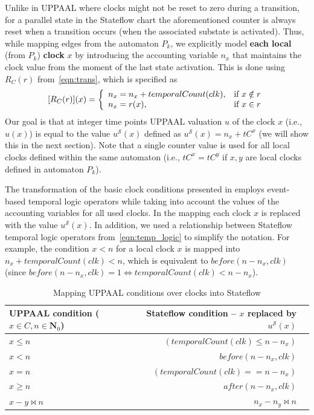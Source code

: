 Unlike in UPPAAL where clocks might not be reset to zero during a transition, for a parallel state in the Stateflow chart the aforementioned counter is always reset when a transition occurs (when the associated substate is activated). Thus, while mapping edges from the automaton $P_k$, we explicitly model \textbf{each local} (from $P_k$) \textbf{clock} $x$ by introducing the accounting variable $n_x$ that maintains the clock value from the moment of the last state activation. This is done using $R_{C}(r)$ from~\eqref{eqn:trans}, which is specified as
\begin{equation}
\label{eqn:lclock_res}
[R_{C}(r)](x) = \left\{
\begin{array}{lr} 
n_x=n_x+temporalCount(clk), & \hbox{if } x\notin r\\
n_x = r(x),& \hbox{if } x\in r
\end{array}
\right.
\end{equation}
Our goal is that at integer time points UPPAAL valuation $u$ of the clock $x$ (i.e.,~$u(x)$) is equal to the value 
$u^\mathcal{S}(x)$ defined as 
$
\label{eqn:us_def}
u^\mathcal{S}(x)=n_x+tC^x
$ 
(we will show this in the next section). Note that a single counter value is used for all local clocks defined within the same automaton (i.e., $tC^x=tC^y$ if $x,y$ are local clocks defined in automaton $P_k$). 


The transformation of the basic clock conditions presented in  employs event-based temporal logic operators while taking into account the values of the accounting variables for all used clocks. In the mapping each clock $x$ is replaced with the value $u^\mathcal{S}(x)$. In addition, we used a relationship between Stateflow temporal logic operators from~\eqref{eqn:temp_logic} to simplify the notation. For example, the condition $x<n$ for a local clock $x$ is mapped into $n_x+temporalCount(clk)<n$, which is equivalent to $before(n-n_x,clk)$ (since $before(n-n_x,clk)=1\Leftrightarrow temporalCount(clk)< n-n_x$).


\begin{table}[!t]
{
\centering
\begin{tabular}{|l|r|r|}
\hline
UPPAAL condition ($x\in C,n\in \mathbf{N}_0$) & Stateflow condition --  $x$ replaced by $u^\mathcal{S}(x)$ \\
\hline
$x\leq n$ &  $(temporalCount(clk)\leq n-n_x)$ \\
$x< n$  & $before(n-n_x,clk)$ \\
$x= n$   & $(temporalCount(clk)==n-n_x)$ \\
$x\geq n$  & $after(n-n_x,clk)$ \\
$x-y\bowtie n$  & $n_x-n_y\bowtie n$  \\
\hline
\end{tabular}
}
\caption{Mapping UPPAAL conditions over clocks into Stateflow}
\label{tab:UP2SF_clocks}
\end{table}



